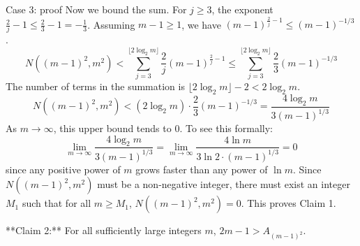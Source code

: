 \documentclass{article} %
\begin{document}
\begin{promptbox}{Case 3: proof}
Now we bound the sum. For $j \ge 3$, the exponent $\frac{2}{j}-1 \le \frac{2}{3}-1 = -\frac{1}{3}$.
Assuming $m-1 \ge 1$, we have $(m-1)^{\frac{2}{j}-1} \le (m-1)^{-1/3}$.
$$N((m-1)^2, m^2) < \sum_{j=3}^{\lfloor 2\log_2 m \rfloor} \frac{2}{j}(m-1)^{\frac{2}{j}-1} \le \sum_{j=3}^{\lfloor 2\log_2 m \rfloor} \frac{2}{3}(m-1)^{-1/3}$$
The number of terms in the summation is $\lfloor 2\log_2 m \rfloor - 2 < 2\log_2 m$.
$$N((m-1)^2, m^2) < (2\log_2 m) \cdot \frac{2}{3}(m-1)^{-1/3} = \frac{4 \log_2 m}{3(m-1)^{1/3}}$$
As $m \to \infty$, this upper bound tends to 0. To see this formally:
$$ \lim_{m\to\infty} \frac{4 \log_2 m}{3(m-1)^{1/3}} = \lim_{m\to\infty} \frac{4 \ln m}{3 \ln 2 \cdot (m-1)^{1/3}} = 0 $$
since any positive power of $m$ grows faster than any power of $\ln m$.
Since $N((m-1)^2, m^2)$ must be a non-negative integer, there must exist an integer $M_1$ such that for all $m \ge M_1$, $N((m-1)^2, m^2) = 0$. This proves Claim 1.

**Claim 2:** For all sufficiently large integers $m$, $2m-1 > A_{(m-1)^2}$.


\end{promptbox}
\end{document}
